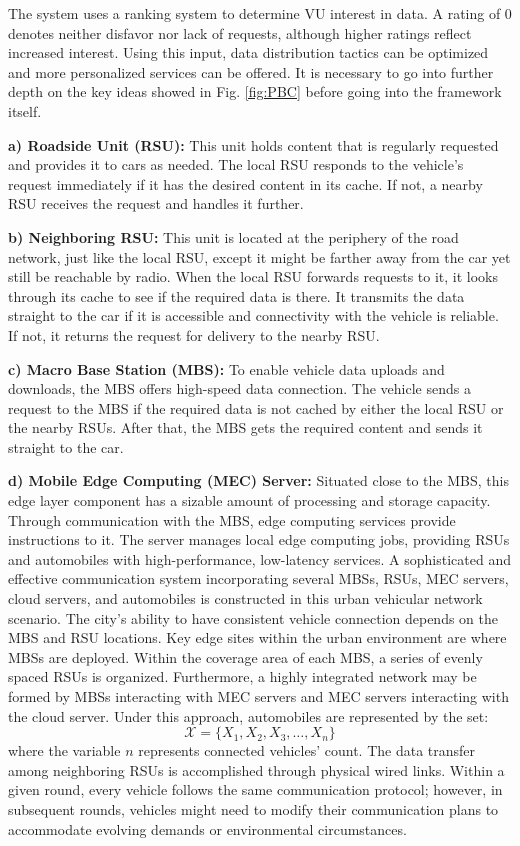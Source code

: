 \documentclass[journal]{IEEEtran}
\begin{document}
The system uses a ranking system to determine VU interest in data. A rating of 0 denotes neither disfavor nor lack of requests, although higher ratings reflect increased interest. Using this input, data distribution tactics can be optimized and more personalized services can be offered. It is necessary to go into further depth on the key ideas showed in Fig. \ref{fig:PBC}  before going into the framework itself.

\textbf{a) Roadside Unit (RSU):} This unit holds content that is regularly requested and provides it to cars as needed. The local RSU responds to the vehicle's request immediately if it has the desired content in its cache. If not, a nearby RSU receives the request and handles it further.

\textbf{b) Neighboring RSU:} This unit is located at the periphery of the road network, just like the local RSU, except it might be farther away from the car yet still be reachable by radio. When the local RSU forwards requests to it, it looks through its cache to see if the required data is there. It transmits the data straight to the car if it is accessible and connectivity with the vehicle is reliable. If not, it returns the request for delivery to the nearby RSU.

\textbf{c) Macro Base Station (MBS):} To enable vehicle data uploads and downloads, the MBS offers high-speed data connection. The vehicle sends a request to the MBS if the required data is not cached by either the local RSU or the nearby RSUs. After that, the MBS gets the required content and sends it straight to the car.

\textbf{d) Mobile Edge Computing (MEC) Server:} Situated close to the MBS, this edge layer component has a sizable amount of processing and storage capacity. Through communication with the MBS, edge computing services provide instructions to it. The server manages local edge computing jobs, providing RSUs and automobiles with high-performance, low-latency services. A sophisticated and effective communication system incorporating several MBSs, RSUs, MEC servers, cloud servers, and automobiles is constructed in this urban vehicular network scenario. The city's ability to have consistent vehicle connection depends on the MBS and RSU locations. Key edge sites within the urban environment are where MBSs are deployed. Within the coverage area of each MBS, a series of evenly spaced RSUs is organized. Furthermore, a highly integrated network may be formed by MBSs interacting with MEC servers and MEC servers interacting with the cloud server.
Under this approach, automobiles are represented by the set:
\begin{equation}
\mathcal{X} = \{ X_1, X_2, X_3, \ldots, X_n \}
\end{equation}
where the variable \( n \) represents connected vehicles' count. The data transfer among neighboring RSUs is accomplished through physical wired links. Within a given round, every vehicle follows the same communication protocol; however, in subsequent rounds, vehicles might need to modify their communication plans to accommodate evolving demands or environmental circumstances.
\end{document}
